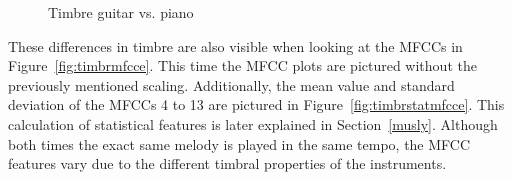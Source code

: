 \begin{figure}[htbp]
	\centering
	\caption{Timbre guitar vs. piano}	
	\label{fig:timbre}
\end{figure}
\FloatBarrier
\noindent These differences in timbre are also visible when looking at the MFCCs in Figure~\ref{fig:timbrmfcce}. This time the MFCC plots are pictured without the previously mentioned scaling. Additionally, the mean value and standard deviation of the MFCCs 4 to 13 are pictured in Figure~\ref{fig:timbrstatmfcce}. This calculation of statistical features is later explained in Section~\ref{musly}. Although both times the exact same melody is played in the same tempo, the MFCC features vary due to the different timbral properties of the instruments. 
